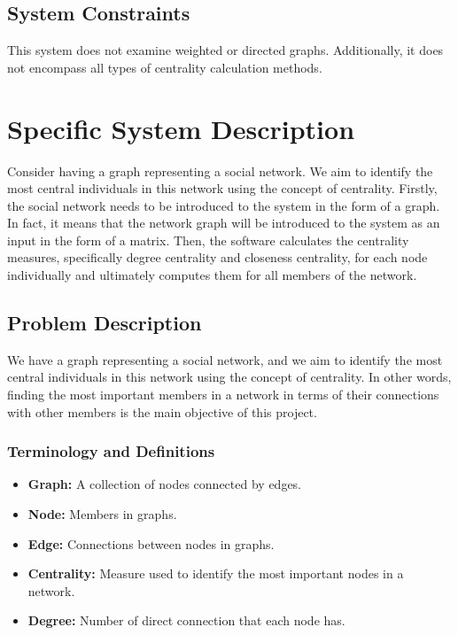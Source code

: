 \documentclass[12pt]{article}
\begin{document}
\subsection{System Constraints}


This system does not examine weighted or directed graphs. Additionally, it does not encompass all types of centrality calculation methods.

\section{Specific System Description}

Consider having a graph representing a social network. We aim to identify the most central individuals in this network using the concept of centrality. Firstly, the social network needs to be introduced to the system in the form of a graph. In fact, it means that the network graph will be introduced to the system as an input in the form of a matrix. Then, the software calculates the centrality measures, specifically degree centrality and closeness centrality, for each node individually and ultimately computes them for all members of the network.

\subsection{Problem Description} \label{Sec_pd}

We have a graph representing a social network, and we aim to identify the most central individuals in this network using the concept of centrality. In other words, finding the most important members in a network in terms of their connections with other members is the main objective of this project.

\subsubsection{Terminology and  Definitions}

\begin{itemize}
\item \textbf{Graph:}  A collection of nodes connected by edges.

\item \textbf{Node:} Members in graphs.
\item \textbf{Edge:} Connections between nodes in graphs.

\item \textbf{Centrality:} Measure used to identify the most important nodes in a network.
\item \textbf{Degree:}  Number of direct connection that each node has.


\end{itemize}
\end{document}
